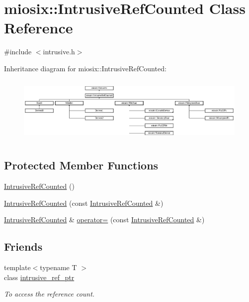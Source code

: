 \hypertarget{classmiosix_1_1_intrusive_ref_counted}{\section{miosix\-:\-:Intrusive\-Ref\-Counted Class Reference}
\label{classmiosix_1_1_intrusive_ref_counted}
}


{\ttfamily \#include $<$intrusive.\-h$>$}

Inheritance diagram for miosix\-:\-:Intrusive\-Ref\-Counted\-:\begin{figure}[H]
\begin{center}
\leavevmode
\includegraphics[height=3.218391cm]{classmiosix_1_1_intrusive_ref_counted}
\end{center}
\end{figure}
\subsection*{Protected Member Functions}
\begin{DoxyCompactItemize}
\item 
\hyperlink{classmiosix_1_1_intrusive_ref_counted_a2ab9718ea1bcdae14fa623ef5dc75eed}{Intrusive\-Ref\-Counted} ()
\item 
\hyperlink{classmiosix_1_1_intrusive_ref_counted_a242062a1358a7c5962439623934a7bf6}{Intrusive\-Ref\-Counted} (const \hyperlink{classmiosix_1_1_intrusive_ref_counted}{Intrusive\-Ref\-Counted} \&)
\item 
\hyperlink{classmiosix_1_1_intrusive_ref_counted}{Intrusive\-Ref\-Counted} \& \hyperlink{classmiosix_1_1_intrusive_ref_counted_ad6ca18890638e98588fcbc43a349a515}{operator=} (const \hyperlink{classmiosix_1_1_intrusive_ref_counted}{Intrusive\-Ref\-Counted} \&)
\end{DoxyCompactItemize}
\subsection*{Friends}
\begin{DoxyCompactItemize}
\item 
\hypertarget{classmiosix_1_1_intrusive_ref_counted_ae55e6fa43aca3ee2466f5c2cc25d5f21}{{\footnotesize template$<$typename T $>$ }\\class \hyperlink{classmiosix_1_1_intrusive_ref_counted_ae55e6fa43aca3ee2466f5c2cc25d5f21}{intrusive\-\_\-ref\-\_\-ptr}}\label{classmiosix_1_1_intrusive_ref_counted_ae55e6fa43aca3ee2466f5c2cc25d5f21}

\begin{DoxyCompactList}\small\item\em To access the reference count. \end{DoxyCompactList}\end{DoxyCompactItemize}
